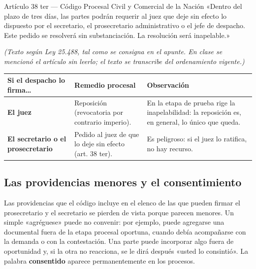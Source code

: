 \documentclass[12pt,oneside]{book}
\begin{document}
\begin{norma}{Artículo 38 ter --- Código Procesal Civil y Comercial de la Nación}
«Dentro del plazo de tres días, las partes podrán requerir al juez que deje sin efecto lo dispuesto por el secretario, el prosecretario administrativo o el jefe de despacho. Este pedido se resolverá sin substanciación. La resolución será inapelable.»

\textit{(Texto según Ley 25.488, tal como se consigna en el apunte. En clase se mencionó el artículo sin leerlo; el texto se transcribe del ordenamiento vigente.)}
\end{norma}

\begin{table}[H]
\centering
\small
\begin{tabularx}{\textwidth}{L{0.20\textwidth} L{0.30\textwidth} Y}
\toprule
\textbf{Si el despacho lo firma\ldots} & \textbf{Remedio procesal} & \textbf{Observación} \\
\midrule
\textbf{El juez} & Reposición (revocatoria por contrario imperio). & En la etapa de prueba rige la inapelabilidad: la reposición es, en general, lo único que queda. \\
\textbf{El secretario o el prosecretario} & Pedido al juez de que lo deje sin efecto (art. 38 ter). & Es peligroso: si el juez lo ratifica, no hay recurso. \\
\bottomrule
\end{tabularx}
\end{table}

\subsection{Las providencias menores y el consentimiento}

Las providencias que el código incluye en el elenco de las que pueden firmar el prosecretario y el secretario se pierden de vista porque parecen menores. Un simple «agréguese» puede no convenir: por ejemplo, puede agregarse una documental fuera de la etapa procesal oportuna, cuando debía acompañarse con la demanda o con la contestación. Una parte puede incorporar algo fuera de oportunidad y, si la otra no reacciona, se le dirá después «usted lo consintió». La palabra \textbf{consentido} aparece permanentemente en los procesos.
\end{document}
